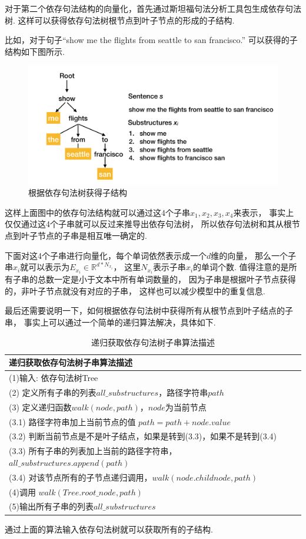 \documentclass[bachelor,adobefonts]{jnuthesis}
\begin{document}
对于第二个依存句法结构的向量化，首先通过斯坦福句法分析工具包生成依存句法树.
这样可以获得依存句法树根节点到叶子节点的形成的子结构.

比如，对于句子“show me the flights from seattle to san francisco.”
可以获得的子结构如下图所示.

\begin{figure}[h!]
  \centering
  \includegraphics[width=0.8\linewidth]{yicunjufashujuli.png}
  \caption{根据依存句法树获得子结构}
\end{figure}

这样上面图中的依存句法结构就可以通过这4个子串$x_{1},x_{2},x_{3},x_{4}$来表示，
事实上仅仅通过这4个子串就可以反过来推导出依存句法树，
所以依存句法树和其从根节点到叶子节点的子串是相互唯一确定的.

下面对这4个子串进行向量化，每个单词依然表示成一个$d$维的向量，
那么一个子串$x_{i}$就可以表示为$E_{x_{i}} \in \mathbb{R}^{d*N_{x_{i}}}$，
这里$N_{x_{i}}$表示子串$x_{i}$的单词个数.
值得注意的是所有子串的总数一定是小于文本中所有单词数量的，
因为子串是根据叶子节点获得的，非叶子节点就没有对应的子串，
这样也可以减少模型中的重复信息.

最后还需要说明一下，如何根据依存句法树中获得所有从根节点到叶子结点的子串，
事实上可以通过一个简单的递归算法解决，具体如下.

\begin{table}[h!]
  \centering
  \begin{tabular}{l}
    \toprule
    \textbf{递归获取依存句法树子串算法描述} \\
    \midrule
    (1)输入: 依存句法树Tree \\
    (2) 定义所有子串的列表$all\_substructures$，路径字符串$path$ \\
    (3) 定义递归函数$walk(node,path)$，$node$为当前节点 \\
    (3.1) 路径字符串加上当前节点的值 $path = path + node.value$ \\
    (3.2) 判断当前节点是不是叶子结点，如果是转到(3.3)，如果不是转到(3.4)\\
    (3.3) 所有子串的列表加上当前的路径字符串，$all\_substructures.append(path)$ \\
    (3.4) 对该节点所有的子节点递归调用，$walk(node.childnode,path)$ \\
    (4)调用 $walk(Tree.root\_node,path)$ \\
    (5)输出所有子串的列表$all\_substructures$ \\
    \bottomrule
  \end{tabular}
  \caption{递归获取依存句法树子串算法描述}
\end{table}
通过上面的算法输入依存句法树就可以获取所有的子结构.
\end{document}
